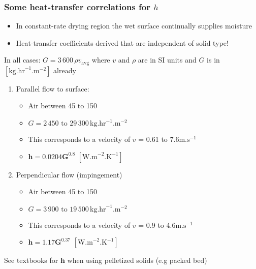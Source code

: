 \begin{frame}\frametitle{Some heat-transfer correlations for $h$}
	\begin{itemize}
		\item	In constant-rate drying region the wet surface continually supplies moisture
		\item	{\small Heat-transfer coefficients derived that are independent of solid type! }
	\end{itemize}

	\vspace{6pt}
	In all cases: $G = 3\,600\,\rho v_\text{avg}$ where $v$ and $\rho$ are in SI units and $G$ is in \([\text{kg.hr}^{-1}\text{.m}^{-2}]\) already
	\begin{enumerate}
		\item	Parallel flow to surface:
		\begin{itemize}
			\item	Air between 45 to 150\degC
			\item	$G = 2\,450\text{~to~}29\,300\, \text{kg.hr}^{-1}\text{.m}^{-2}$
			\item	This corresponds to a velocity of $v$ = 0.61 to 7.6$\text{m.s}^{-1}$
			\vspace{5pt}
			\item	$\mathbf{h = 0.0204G^{0.8}}\,\,[\text{W.m}^{-2}\text{.K}^{-1}]$ \hfill {}
		\end{itemize}
		\vspace{12pt}
		\item	Perpendicular flow (impingement)
		\begin{itemize}
			\item	Air between 45 to 150\degC
			\item	$G = 3\,900\text{~to~}19\,500\, \text{kg.hr}^{-1}\text{.m}^{-2}$
			\item	This corresponds to a velocity of $v$ = 0.9 to 4.6$\text{m.s}^{-1}$
			\vspace{5pt}
			\item	$\mathbf{h = 1.17G^{0.37}}\,\,[\text{W.m}^{-2}\text{.K}^{-1}]$
		\end{itemize}
	\end{enumerate}
	\vspace{12pt}
	See textbooks for $\mathbf h$ when using pelletized solids (e.g packed bed)
\end{frame}

